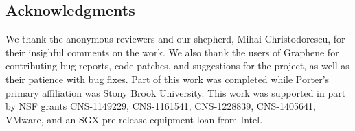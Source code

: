 \begin{edits}
\section*{Acknowledgments}

We thank the anonymous reviewers and our shepherd, Mihai Christodorescu,
 for their insighful comments
on the work.
We also thank the users of Graphene for contributing bug reports, code patches, and suggestions for the project,
as well as their patience with bug fixes.
Part of this work was completed while Porter's primary affiliation was Stony Brook University.
This work was supported in part by NSF grants
CNS-1149229, CNS-1161541, CNS-1228839, CNS-1405641, VMware, and an SGX pre-release equipment loan from Intel.
\end{edits}

